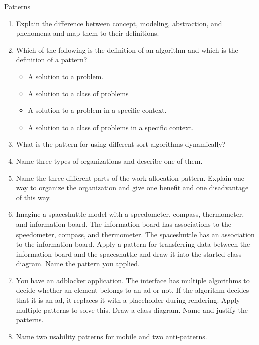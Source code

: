 \documentclass{article}
\begin{document}
\begin{exercise}{Patterns}
  \begin{enumerate}
    \item Explain the difference between concept, modeling, abstraction, and phenomena and map them to their definitions.
    \item Which of the following is the definition of an algorithm and which is the definition of a pattern?
      \begin{itemize}
        \item A solution to a problem.
        \item A solution to a class of problems
        \item A solution to a problem in a specific context.
        \item A solution to a class of problems in a specific context.
      \end{itemize}
    \item What is the pattern for using different sort algorithms dynamically?
    \item Name three types of organizations and describe one of them.
    \item Name the three different parts of the work allocation pattern. Explain one way to organize the organization and give one benefit and one disadvantage of this way.
    \item Imagine a spaceshuttle model with a speedometer, compass, thermometer, and information board. The information board has associations to the speedometer, compass, and thermometer. The spaceshuttle has an association to the information board. Apply a pattern for transferring data between the information board and the spaceshuttle and draw it into the started class diagram. Name the pattern you applied.
    \item You have an adblocker application. The interface has multiple algorithms to decide whether an element belongs to an ad or not. If the algorithm decides that it is an ad, it replaces it with a placeholder during rendering. Apply multiple patterns to solve this. Draw a class diagram. Name and justify the patterns.
    \item Name two usability patterns for mobile and two anti-patterns.
  \end{enumerate}

  \begin{solution}
  \end{solution}
\end{exercise}
\end{document}
